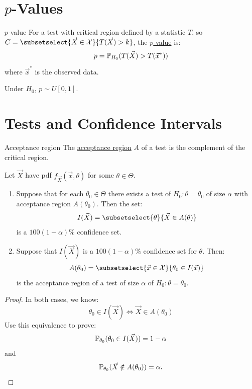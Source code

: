 \documentclass[../Main.tex]{subfiles}
\begin{document}
\section{\texorpdfstring{$p$}{p}-Values}
\begin{definition}{$p$-value}
    For a test with critical region defined by a statistic $T$, so $C = \subsetselect{\vec{X} \in \samplespace}{T(\vec{X}) > k}$, the \underline{$p$-value} is:
    \begin{equation*}
        p = \P_{H_0}(T(\vec{X}) > T(\vec{x}^*))
    \end{equation*}
    where $\vec{x}^*$ is the observed data.
\end{definition}
\begin{proposition}
    Under $H_0$, $p \sim U[0, 1]$.
    \label{propPValueUnif}
\end{proposition}
\section{Tests and Confidence Intervals}
\begin{definition}{Acceptance region}
    The \underline{acceptance region} $A$ of a test is the complement of the critical region.
\end{definition}
\begin{theorem}
    Let $\vec{X}$ have pdf $f_{\vec{X}}(\vec{x}, \theta)$ for some $\theta \in \Theta$.
    \begin{enumerate}
        \item Suppose that for each $\theta_0 \in \Theta$ there exists a test of $H_0 : \theta = \theta_0$ of size $\alpha$ with acceptance region $A(\theta_0)$. Then the set:
            \begin{equation*}
                I(\vec{X}) = \subsetselect{\theta}{\vec{X} \in A(\theta)}
            \end{equation*}
            is a $100(1-\alpha)\%$ confidence set.
        \item Suppose that $I(\vec{X})$ is a $100(1-\alpha)\%$ confidence set for $\theta$. Then:
            \begin{equation*}
                A(\theta_0) = \subsetselect{\vec{x} \in \samplespace}{\theta_0 \in I(\vec{x})}
            \end{equation*}
            is the acceptance region of a test of size $\alpha$ of $H_0: \theta = \theta_0$.
    \end{enumerate}
    \label{thmCCICREquiv}
\end{theorem}
\begin{proof}
    In both cases, we know:
    \begin{equation*}
        \theta_0 \in I(\vec{X}) \iff \vec{X} \in A(\theta_0)
    \end{equation*}
    Use this equivalence to prove:
    \begin{equation*}
        \P_{\theta_0}(\theta_0 \in I(\vec{X})) = 1 - \alpha
    \end{equation*}
    and
    \begin{equation*}
        \P_{\theta_0}(\vec{X} \notin A(\theta_0)) = \alpha.
    \end{equation*}
\end{proof}
\end{document}
